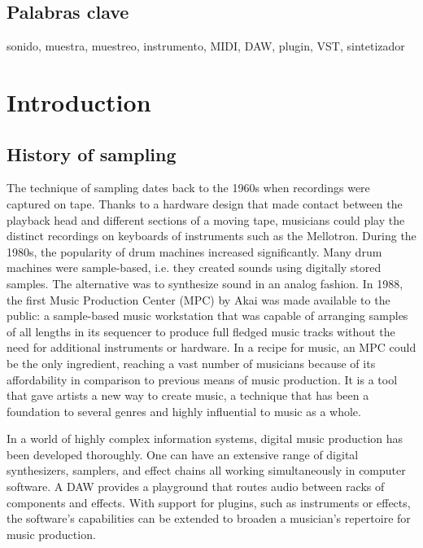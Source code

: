 \documentclass[12pt , a4paper]{article}
\begin{document}
	\subsection{Palabras clave}
	sonido, muestra, muestreo, instrumento, MIDI, DAW, plugin, VST, sintetizador
	


	\newpage
	\section{Introduction}
	\subsection{History of sampling}
	
	The technique of sampling dates back to the 1960s when recordings were captured on tape. Thanks to a hardware design that made contact between the playback head and different sections of a moving tape, musicians could play the distinct recordings on keyboards of instruments such as the Mellotron. During the 1980s, the popularity of drum machines increased significantly. Many drum machines were sample-based, i.e. they created sounds using digitally stored samples. The alternative was to synthesize sound in an analog fashion. In 1988, the first Music Production Center (MPC) by Akai was made available to the public: a sample-based music workstation that was capable of arranging samples of all lengths in its sequencer to produce full fledged music tracks without the need for additional instruments or hardware. In a recipe for music, an MPC could be the only ingredient, reaching a vast number of musicians because of its affordability in comparison to previous means of music production. It is a tool that gave artists a new way to create music, a technique that has been a foundation to several genres and highly influential to music as a whole.
	\par	
	In a world of highly complex information systems, digital music production has been developed thoroughly. One can have an extensive range of digital synthesizers, samplers, and effect chains all working simultaneously in computer software. A DAW provides a playground that routes audio between racks of components and effects. With support for plugins, such as instruments or effects, the software's capabilities can be extended to broaden a musician's repertoire for music production. 

	\newpage
\end{document}
